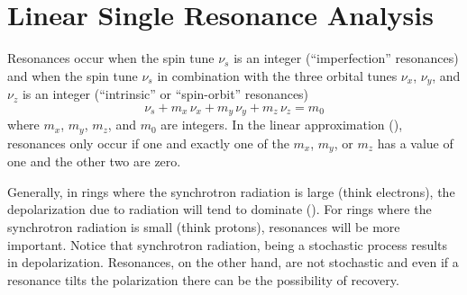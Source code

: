 \section{Linear Single Resonance Analysis}
\label{s:spin.lin.res}

Resonances occur when the spin tune $\nu_s$ is an integer (``imperfection'' resonances) and when the spin
tune $\nu_s$ in combination with the three orbital tunes $\nu_x$, $\nu_y$, and $\nu_z$ is an integer
(``intrinsic'' or ``spin-orbit'' resonances)
\begin{equation}
  \nu_s + m_x \, \nu_x + m_y \, \nu_y + m_z \, \nu_z = m_0
\end{equation}
where $m_x$, $m_y$, $m_z$, and $m_0$ are integers. In the linear approximation (),
resonances only occur if one and exactly one of the $m_x$, $m_y$, or $m_z$ has a value of one and
the other two are zero.

Generally, in rings where the synchrotron radiation is large (think electrons), the depolarization
due to radiation will tend to dominate (). For rings where the synchrotron radiation is
small (think protons), resonances will be more important. Notice that synchrotron radiation, being a
stochastic process results in depolarization. Resonances, on the other hand, are not stochastic and
even if a resonance tilts the polarization there can be the possibility of recovery.

